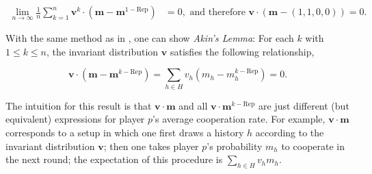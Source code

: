 \documentclass{article}
\theoremstyle{definition}
\begin{document}
\begin{align}
    \lim_{n \rightarrow \infty} \frac{1}{n} \sum_{k=1}^{n} \mathbf{v}^{k} \cdot (\mathbf{m} - \mathbf{m}^{1-\text{Rep}}) & = 0, \text{ and therefore } \mathbf{v} \cdot (\mathbf{m} - (1, 1, 0, 0)) = 0.
\end{align}

With the same method as in \citep{akin:EGADS:2016}, one can show {\it Akin's
Lemma}: For each $k$ with $1\!\le\!k\!\le\!n$, the invariant distribution
$\mathbf{v}$ satisfies the following relationship,

\begin{equation} \label{Eq:AkinsLemma}
\mathbf{v} \cdot (\mathbf{m}-\mathbf{m}^{k-\text{Rep}}) \!=\! \sum_{h\in H} v_h (m_h-m_h^{k-\text{Rep}}) = 0.
\end{equation}

The intuition for this result is that $\mathbf{v}\cdot \mathbf{m}$ and all
$\mathbf{v}\cdot \mathbf{m}^{k-\text{Rep}}$ are just different (but equivalent)
expressions for player $p$'s average cooperation rate. For example,
$\mathbf{v}\cdot\mathbf{m}$ corresponds to a setup in which one first draws a
history $h$ according to the invariant distribution $\mathbf{v}$; then one takes
player $p$'s probability $m_h$ to cooperate in the next round; the expectation
of this procedure is $\sum_{h\in H} v_h m_h$.
\end{document}
